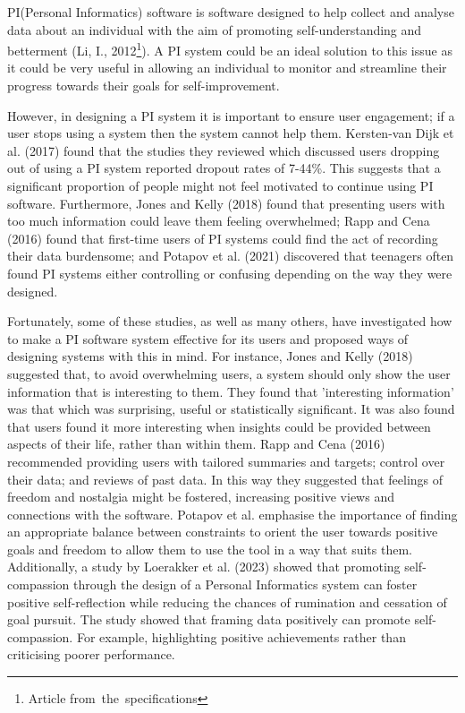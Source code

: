 \documentclass[11pt]{article}
\begin{document}
PI(Personal Informatics) software is software designed to help collect and
analyse data about an individual with the aim of promoting self-understanding
and betterment (Li, I., 2012\footnote{Article from the specifications}).
A PI system could be an ideal solution to this issue as it
could be very useful in allowing an individual to monitor and streamline their
progress towards their goals for self-improvement.\par

However, in designing a PI system it is important to ensure user engagement; if
a user stops using a system then the system cannot help them. Kersten-van Dijk
et al. (2017) found that the studies they reviewed which discussed users
dropping out of using a PI system reported dropout rates of 7-44\%. This
suggests that a significant proportion of people might not feel motivated to
continue using PI software. Furthermore, Jones and Kelly (2018) found that
presenting users with too much information could leave them feeling
overwhelmed; Rapp and Cena (2016) found that first-time users of PI systems
could find the act of recording their data burdensome; and Potapov et al.
(2021) discovered that teenagers often found PI systems either controlling or
confusing depending on the way they were designed.\par

Fortunately, some of these studies, as well as many others, have investigated
how to make a PI software system effective for its users and proposed ways of
designing systems with this in mind. For instance, Jones and Kelly (2018)
suggested that, to avoid overwhelming users, a system should only show the user
information that is interesting to them. They found that 'interesting
information' was that which was surprising, useful or statistically
significant. It was also found that users found it more interesting when
insights could be provided between aspects of their life, rather than within
them. Rapp and Cena (2016) recommended providing users with tailored summaries
and targets; control over their data; and reviews of past data. In this way
they suggested that feelings of freedom and nostalgia might be fostered,
increasing positive views and connections with the software. Potapov et al.
emphasise the importance of finding an appropriate balance between constraints
to orient the user towards positive goals and freedom to allow them to use the
tool in a way that suits them. Additionally, a study by Loerakker et al. (2023)
showed that promoting self-compassion through the design of a Personal
Informatics system can foster positive self-reflection while reducing the
chances of rumination and cessation of goal pursuit. The study showed that
framing data positively can promote self-compassion. For example, highlighting
positive achievements rather than criticising poorer performance.\par
\end{document}
